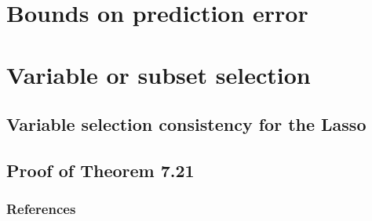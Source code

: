 \documentclass[10pt,handout,english]{beamer}
\begin{document}
\section{Bounds on prediction error}
\frame{\tableofcontents[currentsection]}

\section{Variable or subset selection}
\subsection{Variable selection consistency for the Lasso}
\frame{\tableofcontents[currentsection]}

\subsection{Proof of Theorem 7.21}
\frame{\tableofcontents[currentsection]}


\begin{frame}[allowframebreaks]
\frametitle{References}


\end{frame}
\end{document}
